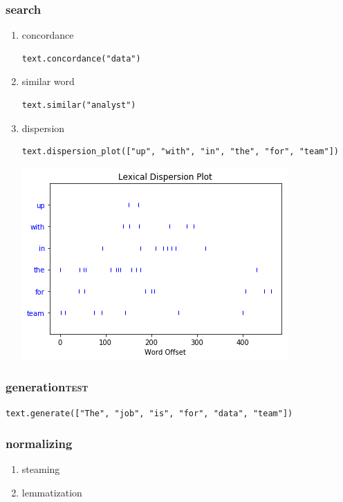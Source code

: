 \documentclass[11pt]{article}
\begin{document}
\subsubsection{search}
\label{sec:org3567c7f}
\begin{enumerate}
\item concordance
\label{sec:org31048d4}
\begin{verbatim}
text.concordance("data")
\end{verbatim}
\item similar word
\label{sec:orgf536167}
\begin{verbatim}
text.similar("analyst")
\end{verbatim}
\item dispersion
\label{sec:org2c8bf07}
\begin{verbatim}
text.dispersion_plot(["up", "with", "in", "the", "for", "team"])
\end{verbatim}

\begin{center}
\includegraphics[width=.9\linewidth]{./obipy-resources/l01HMt.png}
\end{center}
\end{enumerate}
\subsubsection{generation\hfill{}\textsc{test}}
\label{sec:org94d06ce}
\begin{verbatim}
text.generate(["The", "job", "is", "for", "data", "team"])
\end{verbatim}

\subsubsection{normalizing}
\label{sec:orgcc09771}
\begin{enumerate}
\item steaming
\label{sec:org7b4f46e}
\item lemmatization
\label{sec:orgfb3de67}
\end{enumerate}
\end{document}
